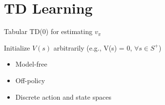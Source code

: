 \documentclass[
	number={11},
	title={Reinforcement Learning}
]{cs584notes}
\begin{document}
\section{TD Learning}\label{sec:td-learning}

\begin{algorithm}[H]
	\caption{Tabular TD(0) for estimating $v_{\pi}$}\label{alg:td}
	\begin{algorithmic}[1]
		\State Initialize $V(s)$ arbitrarily (e.g., V(s) = 0, $\forall s \in S^{+}$)
	\EndFunction
	\end{algorithmic}
\end{algorithm}

\begin{itemize}
	\item Model-free
	\item Off-policy
	\item Discrete action and state spaces
\end{itemize}
\end{document}
